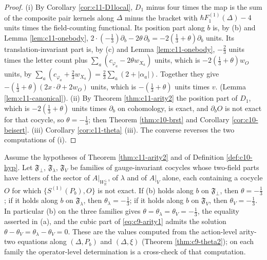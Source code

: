 \begin{proof}
(i) By Corollary \ref{cor:c11-D1local}, $D_1$ minus four times the map is the sum of the composite pair kernels along $\Delta$ minus the bracket with $\hbar F_1^{(1)}(\Delta)-4$ units times the field-counting functional. Its position part along $b$ is, by (b) and Lemma \ref{lem:c11-onebody}, $2\cdot(-\tfrac13)\partial_b-2\theta\,\partial_b=-2(\tfrac13+\theta)\partial_b$ units. Its translation-invariant part is, by (c) and Lemma \ref{lem:c11-onebody}, $-\tfrac23$ units times the letter count plus $\sum_a(c_{\varphi_a}-2\theta w_{X_a})$ units, which is $-2(\tfrac13+\theta)w_O$ units, by $\sum_a(c_{\varphi_a}+\tfrac23w_{X_a})=\tfrac23\sum_a(2+|\alpha_a|)$. Together they give $-(\tfrac13+\theta)(2x\cdot\partial+2w_O)$ units, which is $-(\tfrac13+\theta)$ units times $v.$ (Lemma \ref{lem:c11-canonical}). (ii) By Theorem \ref{thm:c11-arity2} the position part of $D_1$, which is $-2(\tfrac13+\theta)$ units times $\partial_b$ on cohomology, is exact, and $\partial_bO$ is not exact for that cocycle, so $\theta=-\tfrac13$; then Theorem \ref{thm:c10-brst} and Corollary \ref{cor:c10-beisert}. (iii) Corollary \ref{cor:c11-theta} (iii). The converse reverses the two computations of (i).
\end{proof}

\begin{proposition}
\label{prop:c11-theta-sector}
Assume the hypotheses of Theorem \ref{thm:c11-arity2} and of Definition \ref{def:c10-hyp}. Let $\mathfrak F_\perp$, $\mathfrak F_\lambda$, $\mathfrak F_V$ be families of gauge-invariant cocycles whose two-field parts have letters of the sector of $A|_{W_{\mathbb R}^\perp}$, of $\lambda$ and of $A|_V$ alone, each containing a cocycle $O$ for which $\{S^{(1)}(P_b),O\}$ is not exact. If (b) holds along $b$ on $\mathfrak F_\perp$, then $\theta=-\tfrac13$; if it holds along $b$ on $\mathfrak F_\lambda$, then $\theta_\lambda=-\tfrac13$; if it holds along $b$ on $\mathfrak F_V$, then $\theta_V=-\tfrac13$. In particular (b) on the three families gives $\theta=\theta_\lambda=\theta_V=-\tfrac13$, the equality asserted in (a), and the cubic part of \eqref{eq:c9-arity1} admits the solution $\theta-\theta_V=\theta_\lambda-\theta_V=0$. These are the values computed from the action-level arity-two equations along $(\Delta,P_b)$ and $(\Delta,\xi)$ (Theorem \ref{thm:c9-theta2}); on each family the operator-level determination is a cross-check of that computation.
\end{proposition}

